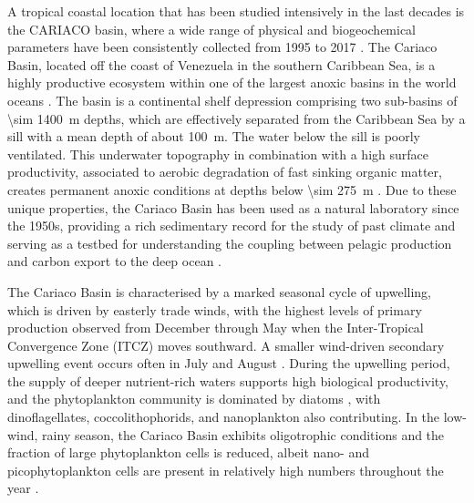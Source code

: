 \documentclass[draft]{agujournal2019}
\begin{document}
    
    A tropical coastal location that has been studied intensively in the last decades is the CARIACO basin, where a wide range of physical and biogeochemical parameters have been consistently collected from 1995 to 2017 \cite{muller-karger_scientific_2019}. 
    The Cariaco Basin, located off the coast of Venezuela in the southern Caribbean Sea, is a highly productive ecosystem within one of the largest anoxic basins in the world oceans \cite{edgcomb_accessing_2011}. The basin is a continental shelf depression comprising two sub-basins of \qty{\sim 1400}{m} depths, which are effectively separated from the Caribbean Sea by a sill with a mean depth of about \qty{100}{m}. The water below the sill is poorly ventilated. This underwater topography in combination with a high surface productivity, associated to aerobic degradation of fast sinking organic matter, creates permanent anoxic conditions at depths below \qty{\sim 275}{m} \cite{thunell_organic_2000}. Due to these unique properties, the Cariaco Basin has been used as a natural laboratory since the 1950s, providing a rich sedimentary record for the study of past climate \cite{hughen1996nature} and serving as a testbed for understanding the coupling between pelagic production and carbon export to the deep ocean \cite{montes_vertical_2012}.

    
    The Cariaco Basin is characterised by a marked seasonal cycle of upwelling, which is driven by easterly trade winds, with the highest levels of primary production observed from December through May when the Inter-Tropical Convergence Zone (ITCZ) moves southward. A smaller wind-driven secondary upwelling event  occurs often in July and August \cite{mullerkarger_annual_2001, astor_seasonal_2003}. During the upwelling period, the supply of deeper nutrient-rich waters supports high biological productivity, and the phytoplankton community is dominated by diatoms \cite{romero_seasonal_2009}, with dinoflagellates, coccolithophorids, and nanoplankton also contributing. In the low-wind, rainy season, the Cariaco Basin exhibits oligotrophic conditions and the fraction of large phytoplankton cells is reduced, albeit nano- and picophytoplankton cells are present in relatively high numbers throughout the year \cite{lorenzoni_characterization_2015}.    
\end{document}

